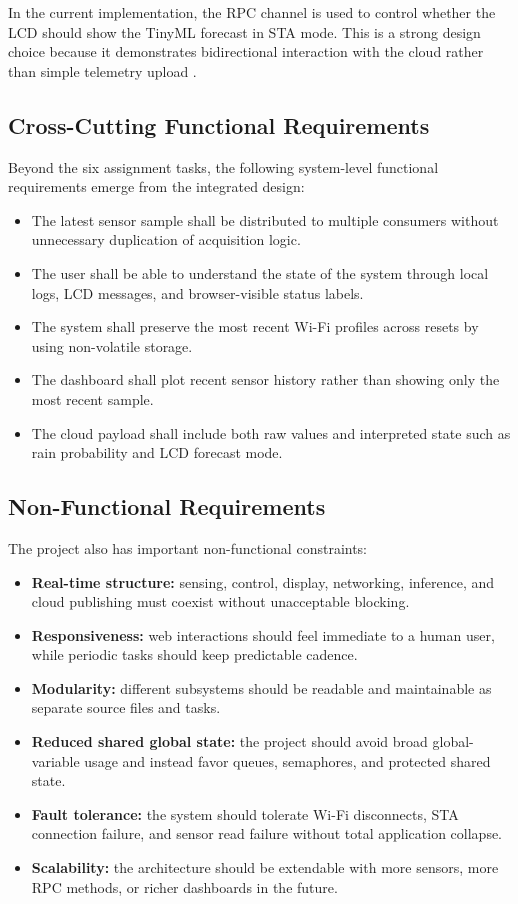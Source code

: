 In the current implementation, the RPC channel is used to control whether the
LCD should show the TinyML forecast in STA mode. This is a strong design choice
because it demonstrates bidirectional interaction with the cloud rather than
simple telemetry upload \cite{coreiot_platform,pubsubclient,arduinojson}.

\subsection{Cross-Cutting Functional Requirements}
Beyond the six assignment tasks, the following system-level functional
requirements emerge from the integrated design:
\begin{itemize}
  \item The latest sensor sample shall be distributed to multiple consumers
  without unnecessary duplication of acquisition logic.
  \item The user shall be able to understand the state of the system through
  local logs, LCD messages, and browser-visible status labels.
  \item The system shall preserve the most recent Wi-Fi profiles across resets
  by using non-volatile storage.
  \item The dashboard shall plot recent sensor history rather than showing only
  the most recent sample.
  \item The cloud payload shall include both raw values and interpreted state
  such as rain probability and LCD forecast mode.
\end{itemize}

\subsection{Non-Functional Requirements}
The project also has important non-functional constraints:
\begin{itemize}
  \item \textbf{Real-time structure:} sensing, control, display, networking,
  inference, and cloud publishing must coexist without unacceptable blocking.
  \item \textbf{Responsiveness:} web interactions should feel immediate to a
  human user, while periodic tasks should keep predictable cadence.
  \item \textbf{Modularity:} different subsystems should be readable and
  maintainable as separate source files and tasks.
  \item \textbf{Reduced shared global state:} the project should avoid broad
  global-variable usage and instead favor queues, semaphores, and protected
  shared state.
  \item \textbf{Fault tolerance:} the system should tolerate Wi-Fi disconnects,
  STA connection failure, and sensor read failure without total application
  collapse.
  \item \textbf{Scalability:} the architecture should be extendable with more
  sensors, more RPC methods, or richer dashboards in the future.
\end{itemize}


